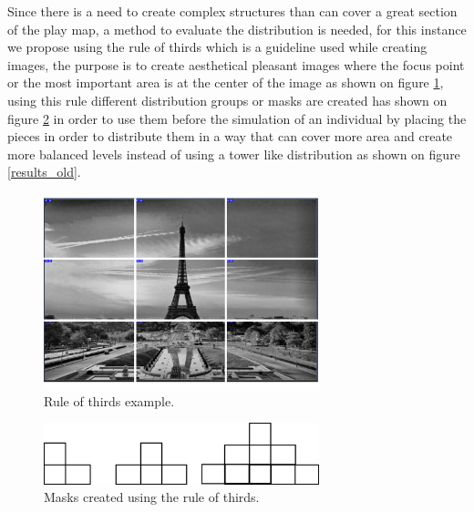 \documentclass[conference]{IEEEtran}
\begin{document}
Since there is a need to create complex structures than can cover a great
section of the play map, a method to evaluate the distribution is needed, for
this instance we propose using the rule of thirds \cite{DarrenRowse} which is a
guideline used while creating images, the purpose is to create
aesthetical pleasant images where the focus point or the most important area is
at the center of the image as shown on figure \ref{rule_of_thirds}, using this
rule different distribution groups or masks are created has shown on figure
\ref{rule_of_thirds_masks} in order to use them before the simulation of an
individual by placing the pieces in order to distribute them in a way that can cover
more area and create more balanced levels instead of using a tower like
distribution as shown on figure \ref{results_old}.

\begin{figure}[htbp]
    \centerline{\includegraphics[width=80mm]{Images/ruleofthirds_example.png}}
    \caption{Rule of thirds example.}
    \label{rule_of_thirds}
\end{figure}

\begin{figure}[htbp]
    \centerline{\includegraphics[width=80mm]{Images/mask_distribution.png}}
    \caption{Masks created using the rule of thirds.}
    \label{rule_of_thirds_masks}
\end{figure}
\end{document}
